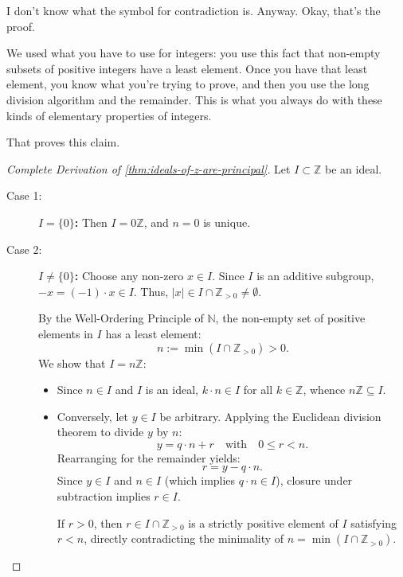\begin{proofWrapper}
\begin{speech}[00:54:50 - 00:56:10]
I don't know what the symbol for contradiction is. Anyway. Okay, that's the proof.
\end{speech}

\begin{speech}[00:56:10 - 00:56:31]
We used what you have to use for integers: you use this fact that non-empty subsets of positive integers have a least element. Once you have that least element, you know what you're trying to prove, and then you use the long division algorithm and the remainder. This is what you always do with these kinds of elementary properties of integers.

That proves this claim. 
\end{speech}

\begin{content}
\begin{proof}[Complete Derivation of \cref{thm:ideals-of-z-are-principal}]
Let $I \subset \mathbb{Z}$ be an ideal.
\begin{description}
    \item[Case 1:] \textbf{$I = \{0\}$:} Then $I = 0\mathbb{Z}$, and $n = 0$ is unique.
    \item[Case 2:] \textbf{$I \neq \{0\}$:} Choose any non-zero $x \in I$. Since $I$ is an additive subgroup, $-x = (-1) \cdot x \in I$. Thus, $|x| \in I \cap \mathbb{Z}_{>0} \neq \emptyset$.
    
    By the Well-Ordering Principle of $\mathbb{N}$, the non-empty set of positive elements in $I$ has a least element:
    \[
    n := \min(I \cap \mathbb{Z}_{>0}) > 0.
    \]
    We show that $I = n\mathbb{Z}$:
    \begin{itemize}
        \item Since $n \in I$ and $I$ is an ideal, $k \cdot n \in I$ for all $k \in \mathbb{Z}$, whence $n\mathbb{Z} \subseteq I$.
        \item Conversely, let $y \in I$ be arbitrary. Applying the Euclidean division theorem to divide $y$ by $n$:
        \[
        y = q \cdot n + r \quad \text{with} \quad 0 \le r < n.
        \]
        Rearranging for the remainder yields:
        \[
        r = y - q \cdot n.
        \]
        Since $y \in I$ and $n \in I$ (which implies $q \cdot n \in I$), closure under subtraction implies $r \in I$.
        
        If $r > 0$, then $r \in I \cap \mathbb{Z}_{>0}$ is a strictly positive element of $I$ satisfying $r < n$, directly contradicting the minimality of $n = \min(I \cap \mathbb{Z}_{>0})$.
        

\end{itemize}
\end{description}
\end{proof}
\end{content}
\end{proofWrapper}
